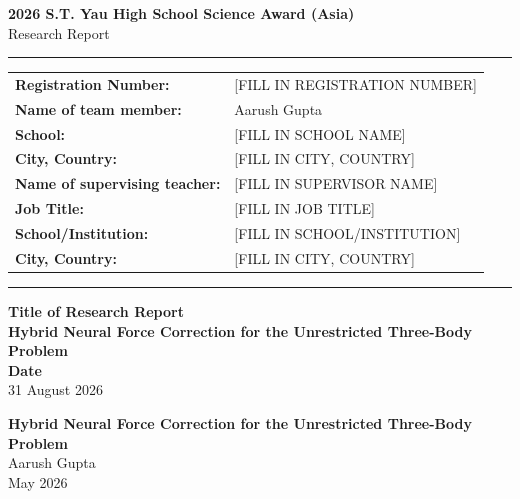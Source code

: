\documentclass[12pt,a4paper]{article}
\begin{document}
\begin{titlepage}
\centering
\vspace*{1.5cm}
{\large \textbf{2026 S.T. Yau High School Science Award (Asia)}}\\[0.5cm]
{\large Research Report}\\[1.5cm]
\hrule
\vspace{0.5cm}
{\small
\begin{tabular}{ll}
\textbf{Registration Number:} & [FILL IN REGISTRATION NUMBER] \\[0.3cm]
\textbf{Name of team member:} & Aarush Gupta \\
\textbf{School:}              & [FILL IN SCHOOL NAME] \\
\textbf{City, Country:}       & [FILL IN CITY, COUNTRY] \\[0.6cm]
\textbf{Name of supervising teacher:} & [FILL IN SUPERVISOR NAME] \\
\textbf{Job Title:}           & [FILL IN JOB TITLE] \\
\textbf{School/Institution:}  & [FILL IN SCHOOL/INSTITUTION] \\
\textbf{City, Country:}       & [FILL IN CITY, COUNTRY] \\
\end{tabular}
}
\vspace{0.5cm}
\hrule
\vspace{2.5cm}
{\large \textbf{Title of Research Report}}\\[1cm]
{\LARGE \textbf{Hybrid Neural Force Correction for the Unrestricted Three-Body Problem}}\\[2.5cm]
{\large \textbf{Date}}\\[0.5cm]
{\large 31 August 2026}
\end{titlepage}

\setcounter{page}{1}

\begin{center}
{\LARGE \textbf{Hybrid Neural Force Correction for the Unrestricted Three-Body Problem}}\\[0.8cm]
{\large Aarush Gupta}\\[0.3cm]
{\normalsize May 2026}\\[1.2cm]
\end{center}
\end{document}
